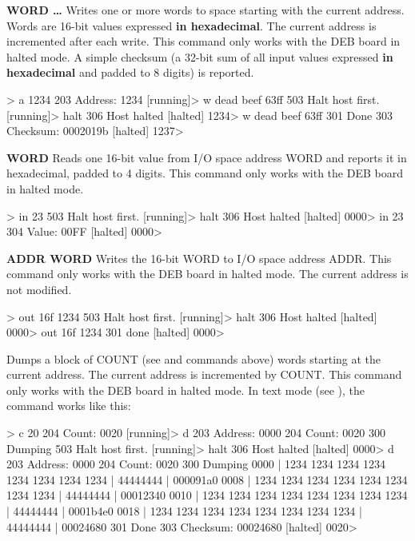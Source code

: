 \begin{description}
\item{\bfseries{} WORD …} Writes one or more words to space starting
  with the current address. Words are 16-bit values expressed {\bfseries in
    hexadecimal}. The current address is incremented after each
  write. This command only works with the \gls{DEB} board in halted
  mode. A simple checksum (a 32-bit sum of all input values expressed
  {\bfseries in hexadecimal} and padded to 8 digits) is reported.

\begin{debcode}
[running]> a 1234
203 Address: 1234
[running]> w dead beef 63ff
503 Halt host first.
[running]> halt
306 Host halted
[halted] 1234> w dead beef 63ff
301 Done
303 Checksum: 0002019b
[halted] 1237> 
\end{debcode}


\item{\bfseries{} WORD} Reads one 16-bit value from I/O space address
  WORD and reports it in hexadecimal, padded to 4 digits. This command
  only works with the \gls{DEB} board in halted mode.

\begin{debcode}
[running]> in 23
503 Halt host first.
[running]> halt
306 Host halted
[halted] 0000> in 23
304 Value: 00FF
[halted] 0000> 
\end{debcode}


\item{\bfseries{} ADDR WORD} Writes the 16-bit WORD to I/O space
  address ADDR. This command only works with the \gls{DEB} board in
  halted mode. The current address is not modified.

\begin{debcode}
[running]> out 16f 1234
503 Halt host first.
[running]> halt
306 Host halted
[halted] 0000> out 16f 1234
301 done
[halted] 0000> 
\end{debcode}


\item{\bfseries{}} Dumps a block of COUNT (see  and 
  commands above) words starting at the current address. The current
  address is incremented by COUNT. This command only works with the
  \gls{DEB} board in halted mode. In text mode (see ), the
  command works like this:

\begin{debcode}
[running]> c 20
204 Count: 0020
[running]> d
203 Address: 0000
204 Count: 0020
300 Dumping
503 Halt host first.
[running]> halt
306 Host halted
[halted] 0000> d
203 Address: 0000
204 Count: 0020
300 Dumping
0000 | 1234 1234 1234 1234 1234 1234 1234 1234 | 44444444 | 000091a0
0008 | 1234 1234 1234 1234 1234 1234 1234 1234 | 44444444 | 00012340
0010 | 1234 1234 1234 1234 1234 1234 1234 1234 | 44444444 | 0001b4e0
0018 | 1234 1234 1234 1234 1234 1234 1234 1234 | 44444444 | 00024680
301 Done
303 Checksum: 00024680
[halted] 0020>
\end{debcode}


\end{description}
